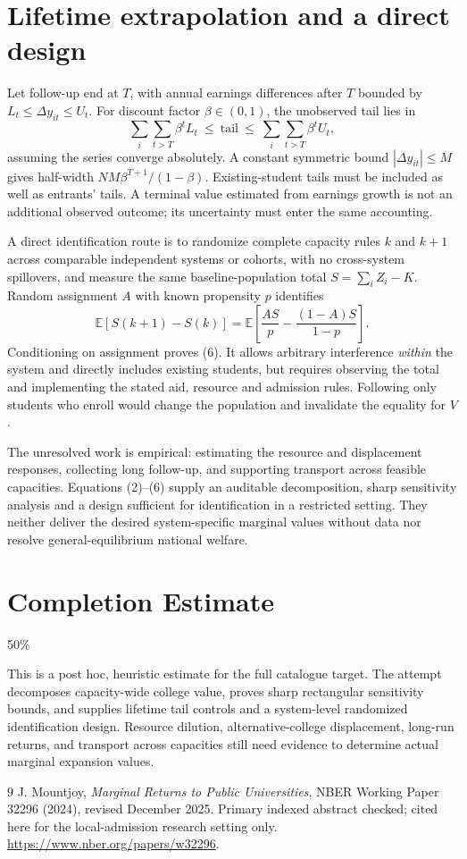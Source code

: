 \documentclass[11pt,a4paper]{article}
\newcommand{\E}{\mathbb E}
\begin{document}
\section{Lifetime extrapolation and a direct design}
Let follow-up end at $T$, with annual earnings differences after $T$ bounded by $L_t\le\Delta y_{it}\le U_t$. For discount factor $\beta\in(0,1)$, the unobserved tail lies in
\[
 \sum_i\sum_{t>T}\beta^tL_t
 \ \le\ \text{tail}\ \le\
 \sum_i\sum_{t>T}\beta^tU_t,                               \tag{5}
\]
assuming the series converge absolutely. A constant symmetric bound $|\Delta y_{it}|\le M$ gives half-width $NM\beta^{T+1}/(1-\beta)$. Existing-student tails must be included as well as entrants' tails. A terminal value estimated from earnings growth is not an additional observed outcome; its uncertainty must enter the same accounting.

A direct identification route is to randomize complete capacity rules $k$ and $k+1$ across comparable independent systems or cohorts, with no cross-system spillovers, and measure the same baseline-population total $S=\sum_iZ_i-K$. Random assignment $A$ with known propensity $p$ identifies
\[
 \E[S(k+1)-S(k)]
 =\E\left[\frac{AS}{p}-\frac{(1-A)S}{1-p}\right].          \tag{6}
\]
Conditioning on assignment proves (6). It allows arbitrary interference \emph{within} the system and directly includes existing students, but requires observing the total and implementing the stated aid, resource and admission rules. Following only students who enroll would change the population and invalidate the equality for $V$.

The unresolved work is empirical: estimating the resource and displacement responses, collecting long follow-up, and supporting transport across feasible capacities. Equations (2)--(6) supply an auditable decomposition, sharp sensitivity analysis and a design sufficient for identification in a restricted setting. They neither deliver the desired system-specific marginal values without data nor resolve general-equilibrium national welfare.

\section{Completion Estimate}
50\%

This is a post hoc, heuristic estimate for the full catalogue target.
The attempt decomposes capacity-wide college value, proves sharp rectangular sensitivity bounds, and supplies lifetime tail controls and a system-level randomized identification design. Resource dilution, alternative-college displacement, long-run returns, and transport across capacities still need evidence to determine actual marginal expansion values.

\begin{thebibliography}{9}
 J. Mountjoy, \emph{Marginal Returns to Public Universities}, NBER Working Paper 32296 (2024), revised December 2025. Primary indexed abstract checked; cited here for the local-admission research setting only. \url{https://www.nber.org/papers/w32296}.
\end{thebibliography}
\end{document}
